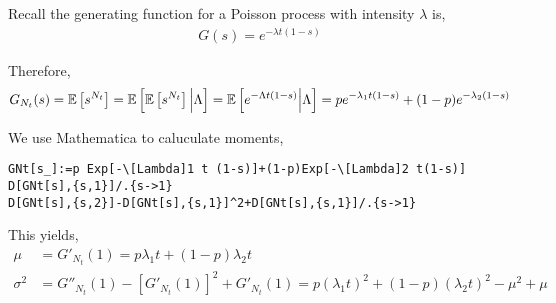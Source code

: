 \begin{solution}[Solution]
Recall the generating function for a Poisson process with intensity \( \lambda \) is,
\begin{align*}
    G(s) = e^{-\lambda t(1-s)}
\end{align*}


Therefore,
\begin{align*}
    G_{N_t}(s) 
    = \mathbb{E} \left[ s^{N_t} \right] 
    = \mathbb{E} \left[ \mathbb{E} \left[ s^{N_t} \right] \Big| \Lambda \right] 
    = \mathbb{E}\left[ e^{-\Lambda t(1-s)} \Big| \Lambda \right]
    = pe^{-\lambda_1t(1-s)} + (1-p) e^{-\lambda_2(1-s)}
\end{align*}

We use Mathematica to caluculate moments,
\begin{lstlisting}
GNt[s_]:=p Exp[-\[Lambda]1 t (1-s)]+(1-p)Exp[-\[Lambda]2 t(1-s)]
D[GNt[s],{s,1}]/.{s->1}
D[GNt[s],{s,2}]-D[GNt[s],{s,1}]^2+D[GNt[s],{s,1}]/.{s->1}
\end{lstlisting}

This yields,
\begin{align*}
    \mu &= G'_{N_t}(1) = p \lambda_1 t  + (1-p) \lambda_2 t 
    \\\sigma^2 &= G''_{N_t}(1) - [G'_{N_t}(1)]^2 + G'_{N_t}(1) =  
    p (\lambda_1 t)^2 + (1-p)(\lambda_2 t)^2 - \mu^2 + \mu
\end{align*}
\end{solution}
